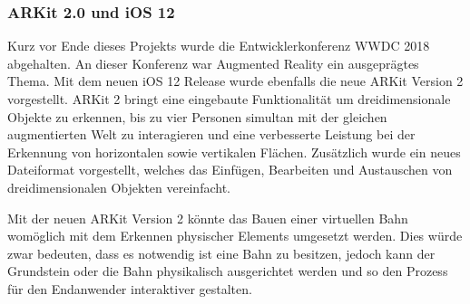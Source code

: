 \subsubsection{ARKit 2.0 und iOS 12}
Kurz vor Ende dieses Projekts wurde die Entwicklerkonferenz WWDC 2018 abgehalten. An dieser Konferenz war Augmented Reality ein ausgeprägtes Thema. Mit dem neuen iOS 12 Release wurde ebenfalls die neue ARKit Version 2 vorgestellt. ARKit 2 bringt eine eingebaute Funktionalität um dreidimensionale Objekte zu erkennen, bis zu vier Personen simultan mit der gleichen augmentierten Welt zu interagieren und eine verbesserte Leistung bei der Erkennung von horizontalen sowie vertikalen Flächen. Zusätzlich wurde ein neues Dateiformat vorgestellt, welches das Einfügen, Bearbeiten und Austauschen von dreidimensionalen Objekten vereinfacht. 

Mit der neuen ARKit Version 2 könnte das Bauen einer virtuellen Bahn womöglich mit dem Erkennen physischer Elements umgesetzt werden. Dies würde zwar bedeuten, dass es notwendig ist eine Bahn zu besitzen, jedoch kann der Grundstein oder die Bahn physikalisch ausgerichtet werden und so den Prozess für den Endanwender interaktiver gestalten.
